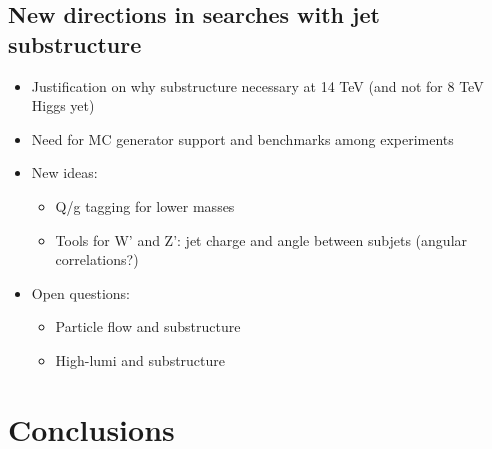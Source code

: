 \documentclass{PoS}
\begin{document}
\subsection{New directions in searches with jet substructure}
\begin{itemize}
\item Justification on why substructure necessary at 14 TeV (and not for 8 TeV Higgs yet)
\item Need for MC generator support and benchmarks among experiments
\cite{Chatrchyan:2013rla}%
\cite{ATLAS:2012am}%
\item New ideas:
\begin{itemize}
 \item Q/g tagging for lower masses
 \item Tools for W' and Z': jet charge and angle between subjets (angular correlations?)
\end{itemize}
\item Open questions:
\begin{itemize}
 \item Particle flow and substructure
 \item High-lumi and substructure
\end{itemize}

\end{itemize}


\section{Conclusions}



\end{document}
